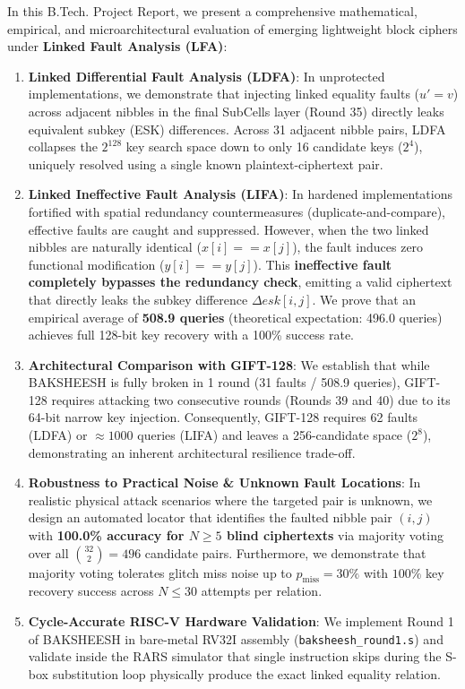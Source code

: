 In this B.Tech. Project Report, we present a comprehensive mathematical, empirical, and microarchitectural evaluation of emerging lightweight block ciphers under \textbf{Linked Fault Analysis (LFA)}:
\begin{enumerate}
    \item \textbf{Linked Differential Fault Analysis (LDFA)}: In unprotected implementations, we demonstrate that injecting linked equality faults ($u' = v$) across adjacent nibbles in the final SubCells layer (Round 35) directly leaks equivalent subkey (ESK) differences. Across 31 adjacent nibble pairs, LDFA collapses the $2^{128}$ key search space down to only 16 candidate keys ($2^4$), uniquely resolved using a single known plaintext-ciphertext pair.
    \item \textbf{Linked Ineffective Fault Analysis (LIFA)}: In hardened implementations fortified with spatial redundancy countermeasures (duplicate-and-compare), effective faults are caught and suppressed. However, when the two linked nibbles are naturally identical ($x[i] == x[j]$), the fault induces zero functional modification ($y[i] == y[j]$). This \textbf{ineffective fault completely bypasses the redundancy check}, emitting a valid ciphertext that directly leaks the subkey difference $\Delta esk[i, j]$. We prove that an empirical average of \textbf{508.9 queries} (theoretical expectation: 496.0 queries) achieves full 128-bit key recovery with a 100\% success rate.
    \item \textbf{Architectural Comparison with GIFT-128}: We establish that while BAKSHEESH is fully broken in 1 round (31 faults / 508.9 queries), GIFT-128 requires attacking two consecutive rounds (Rounds 39 and 40) due to its 64-bit narrow key injection. Consequently, GIFT-128 requires 62 faults (LDFA) or $\approx 1000$ queries (LIFA) and leaves a 256-candidate space ($2^8$), demonstrating an inherent architectural resilience trade-off.
    \item \textbf{Robustness to Practical Noise \& Unknown Fault Locations}: In realistic physical attack scenarios where the targeted pair is unknown, we design an automated locator that identifies the faulted nibble pair $(i, j)$ with \textbf{100.0\% accuracy for $N \ge 5$ blind ciphertexts} via majority voting over all $\binom{32}{2} = 496$ candidate pairs. Furthermore, we demonstrate that majority voting tolerates glitch miss noise up to $p_{\text{miss}} = 30\%$ with $100\%$ key recovery success across $N \le 30$ attempts per relation.
    \item \textbf{Cycle-Accurate RISC-V Hardware Validation}: We implement Round 1 of BAKSHEESH in bare-metal RV32I assembly (\texttt{baksheesh\_round1.s}) and validate inside the RARS simulator that single instruction skips during the S-box substitution loop physically produce the exact linked equality relation.

\end{enumerate}
